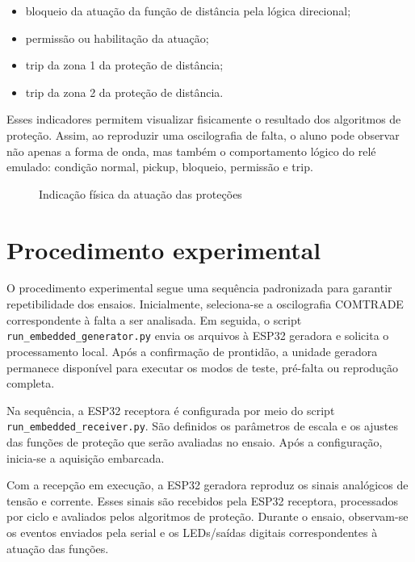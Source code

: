 \begin{itemize}
  \item bloqueio da atuação da função de distância pela lógica direcional;
  \item permissão ou habilitação da atuação;
  \item trip da zona 1 da proteção de distância;
  \item trip da zona 2 da proteção de distância.
\end{itemize}

Esses indicadores permitem visualizar fisicamente o resultado dos algoritmos de proteção. Assim, ao reproduzir uma oscilografia de falta, o aluno pode observar não apenas a forma de onda, mas também o comportamento lógico do relé emulado: condição normal, pickup, bloqueio, permissão e trip.

\begin{figure}[H]
  \centering
  \caption{Indicação física da atuação das proteções}
  \label{fig:indicacao-leds}
\end{figure}

\section{Procedimento experimental}

O procedimento experimental segue uma sequência padronizada para garantir repetibilidade dos ensaios. Inicialmente, seleciona-se a oscilografia COMTRADE correspondente à falta a ser analisada. Em seguida, o script \texttt{run\_embedded\_generator.py} envia os arquivos à ESP32 geradora e solicita o processamento local. Após a confirmação de prontidão, a unidade geradora permanece disponível para executar os modos de teste, pré-falta ou reprodução completa.

Na sequência, a ESP32 receptora é configurada por meio do script \texttt{run\_embedded\_receiver.py}. São definidos os parâmetros de escala e os ajustes das funções de proteção que serão avaliadas no ensaio. Após a configuração, inicia-se a aquisição embarcada.

Com a recepção em execução, a ESP32 geradora reproduz os sinais analógicos de tensão e corrente. Esses sinais são recebidos pela ESP32 receptora, processados por ciclo e avaliados pelos algoritmos de proteção. Durante o ensaio, observam-se os eventos enviados pela serial e os LEDs/saídas digitais correspondentes à atuação das funções.

